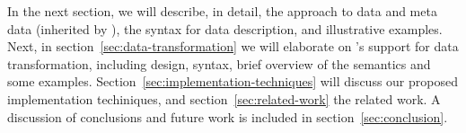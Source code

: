 In the next section, we will describe, in detail, the \pads{} approach
to data and meta data (inherited by \datatype{}), the \datatype{}
syntax for data description, and illustrative examples. Next, in
section~\ref{sec:data-transformation} we will elaborate on
\datatype{}'s support for data transformation, including design,
syntax, brief overview of the semantics and some examples.
Section~\ref{sec:implementation-techniques} will discuss our proposed
implementation techiniques, and section~\ref{sec:related-work} the
related work. A discussion of conclusions and future work is included
in section~\ref{sec:conclusion}.

